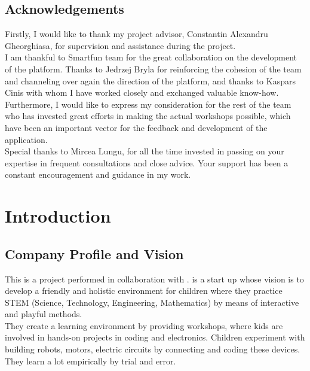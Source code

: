 
\begin{center}\section*{Acknowledgements}
\end{center}
\vspace{1.5 cm}

Firstly, I would like to thank my project advisor, Constantin Alexandru Gheorghiasa, for supervision and assistance during the project. \\

I am thankful to Smartfun team for the great collaboration on the development of the platform. Thanks to Jedrzej Bryla for reinforcing the cohesion of the team and channeling over again the direction of the platform, and thanks to Kaspars Cinis with whom I have worked closely and exchanged valuable know-how. Furthermore, I would like to express my consideration for the rest of the team who has invested great efforts in making the actual workshops possible, which have been an important vector for the feedback and development of the application. \\

Special thanks to Mircea Lungu, for all the time invested in passing on your expertise in frequent consultations and close advice. Your support has been a constant encouragement and guidance in my work. \\ 
	
\chapter{Introduction}

\section{Company Profile and Vision}

This is a project performed in collaboration with \sfun. \sfun is a start up whose vision is to develop a friendly and holistic environment for children where they practice STEM (Science, Technology, Engineering, Mathematics) by means of interactive and playful methods. \\

They create a learning environment by providing workshops, where kids are involved in hands-on projects in coding and electronics. Children experiment with building robots, motors, electric circuits by connecting and coding these devices. They learn a lot empirically by trial and error.  \\

